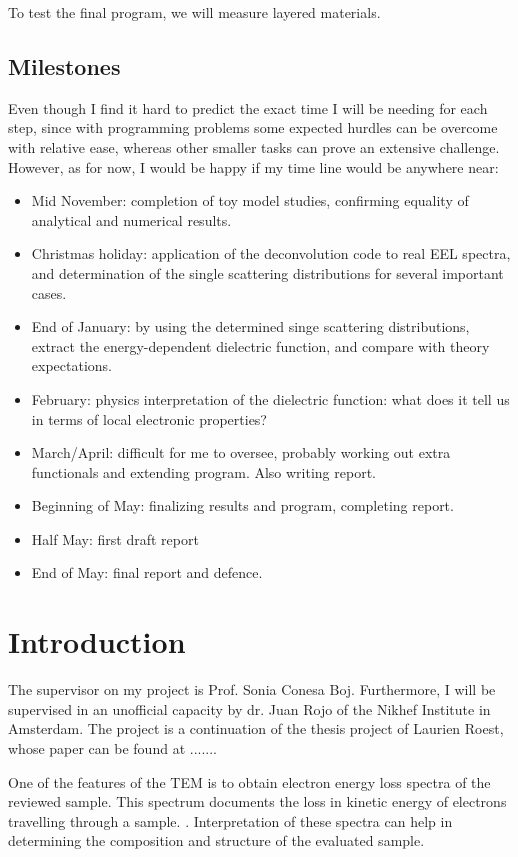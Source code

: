 \documentclass[12pt,a4paper]{article}
\numberwithin{equation}{section}
\numberwithin{figure}{section}
\numberwithin{table}{section}
\begin{document}
To test the final program, we will measure layered materials.

\newpage
\subsection{Milestones}
Even though I find it hard to predict the exact time I will be needing for each step, since with programming problems some expected hurdles can be overcome with relative ease, whereas other smaller tasks can prove an extensive challenge. However, as for now, I would be happy if my time line would be anywhere near:
\begin{itemize}
\item Mid November: completion of toy model studies, confirming equality of analytical and numerical results.
\item Christmas holiday: application of the deconvolution code to real EEL spectra, and determination of the single scattering distributions for several important cases.
\item End of January: by using the determined singe scattering distributions, extract the energy-dependent dielectric function, and compare with theory expectations.
\item February: physics interpretation of the dielectric function: what does it tell us in terms of local electronic properties?
\item March/April: difficult for me to oversee, probably working out extra functionals and extending program. Also writing report.
\item Beginning of May: finalizing results and program, completing report.
\item Half May: first draft report
\item End of May: final report and defence.
\end{itemize}

\section{Introduction}
The supervisor on my project is Prof. Sonia Conesa Boj. Furthermore, I will be supervised in an unofficial capacity by dr. Juan Rojo of the Nikhef Institute in Amsterdam. The project is a continuation of the thesis project of Laurien Roest, whose paper can be found at .......



One of the features of the TEM is to obtain electron energy loss spectra of the reviewed sample. This spectrum documents the loss in kinetic energy of electrons travelling through a sample. \cite{egerton_article}. Interpretation of these spectra can help in determining the composition and structure of the evaluated sample. 
\end{document}
